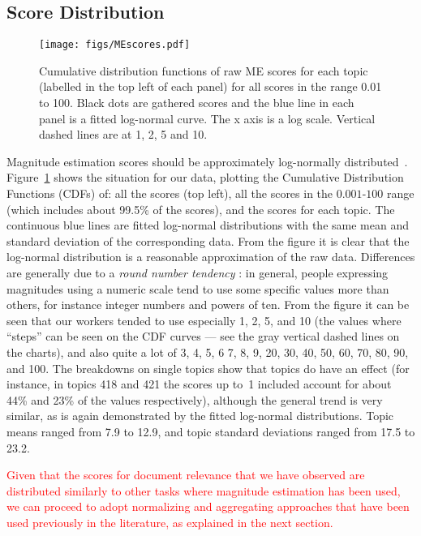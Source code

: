 \subsection{Score Distribution}
\label{sec:score-distribution}

\begin{figure}[t]
  \centering
  \texttt{[image: figs/MEscores.pdf]}
  \caption{Cumulative distribution functions of raw ME scores for each topic 
(labelled in the top left of each panel) for all scores in the range
0.01 to 100. Black dots are gathered scores and the blue line in each panel is a 
fitted log-normal curve. The x axis is a log scale. 
Vertical dashed lines are at 1, 2, 5 and 10.}
  \label{fig:ME-raw-scores}
\end{figure}

Magnitude estimation scores should be approximately
log-normally distributed~\citep{Mar74,moskowitz:1977}. 
Figure~\ref{fig:ME-raw-scores} shows the situation for our data, 
plotting the Cumulative Distribution Functions (CDFs) of:
all the scores (top left), all the scores in the $0.001$-$100$ range
(which includes about 99.5\% of the scores), and the scores for each
topic. 
The continuous blue lines are fitted log-normal distributions with the
same mean and standard deviation of the corresponding data.  
From the figure it is clear that the log-normal distribution is a
reasonable approximation of the raw data. 
Differences are generally due to a \emph{round number tendency}
\cite{moskowitz:1977}: in general, people expressing magnitudes using
a numeric scale tend to use some specific values more than others, for
instance integer numbers and powers of ten. 
From the figure it can be seen that our workers tended to use
especially 1, 2, 5, and 10 (the values where ``steps'' can be seen on
the CDF curves --- see the gray vertical dashed lines on the charts),
and also quite a lot of 3, 4, 5, 6 7, 8, 9, 20, 30, 40, 50, 60, 70,
80, 90, and 100. 
The breakdowns on single topics show that topics do have an effect
(for instance, in topics 418 and 421 the scores up to~1 included
account for about 44\% and 23\% of the values respectively), although
the general trend is very similar, as is again demonstrated by the
fitted log-normal distributions.
Topic means ranged from 7.9 to 12.9, and topic standard deviations ranged
from 17.5 to 23.2.

\textcolor{red}{ Given that the scores for document relevance that we
have observed are distributed similarly to other tasks where magnitude
estimation has been used, we can proceed to adopt normalizing and
aggregating approaches that have been used previously in the literature, as
explained in the next section.
} 

